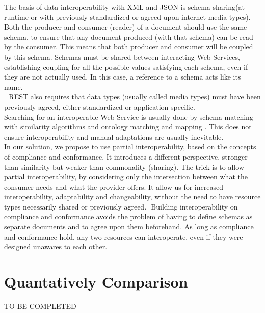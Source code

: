 The basis of data interoperability with XML and JSON is schema sharing(at runtime or with previously standardized
or agreed upon internet media types). Both the producer and consumer (reader) of a document should use the same
schema, to ensure that any document produced (with that schema) can be read by the consumer. This means that
both producer and consumer will be coupled by this schema. Schemas must be shared between interacting Web Services,
 establishing coupling for all the possible values satisfying each schema, even if they are not actually used.
 In this case, a reference to a schema acts like its name.\\
 
REST also requires that data types (usually called media types) must have been previously agreed, either
standardized or application specific.\\
Searching for an interoperable Web Service is usually done by schema matching with similarity algorithms \citep{expertsystems:x1}
and ontology matching and mapping \citep{Ontology:matching}. This does not ensure interoperability and manual adaptations are usually
inevitable. \\
In our solution, we propose to use partial interoperability, based on the concepts of compliance and conformance.
It introduces a different
perspective, stronger than similarity but weaker than commonality (sharing). The trick is to allow partial
interoperability, by considering only the intersection between what the consumer needs and what the provider offers.
It allow us for increased interoperability, adaptability and changeability, without the need to have resource types
necessarily shared or previously agreed. 
Building interoperability on compliance and conformance avoids the problem of having to define schemas as
separate documents and to agree upon them beforehand. As long as compliance and conformance hold, any two
resources can interoperate, even if they were designed unawares to each other.

\section{Quantatively Comparison}

TO BE COMPLETED
